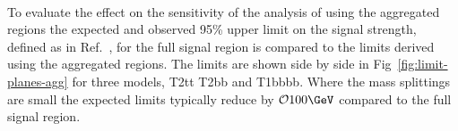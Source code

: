 \begin{figure}[!tbhp]
\begin{center}
     \\
  \end{center}
\end{figure}

To evaluate the effect on the sensitivity of the \alphat analysis of using
the aggregated regions the expected and observed 95\% upper limit
on the signal strength, defined as in Ref.~\cite{Chatrchyan:2012tx}, for the full signal region 
is compared to the limits derived using the aggregated regions. The limits are shown side by side
in Fig~\ref{fig:limit-planes-agg} for three models, T2tt T2bb and T1bbbb. Where the mass
splittings are small the expected limits typically reduce by $\mathcal{O} 100\GeV$ 
compared to the full signal region.

